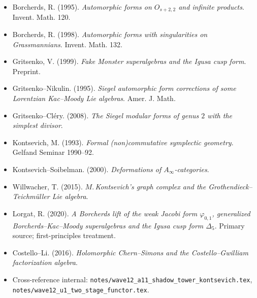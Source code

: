 \documentclass[11pt]{article}
\newcommand{\phii}{\varphi_{0,1}}
\newcommand{\Dlt}{\Delta_5}
\begin{document}
\begin{itemize}
\item Borcherds, R. (1995). \emph{Automorphic forms on $O_{s+2,2}$
and infinite products}. Invent. Math. 120.
\item Borcherds, R. (1998). \emph{Automorphic forms with
singularities on Grassmannians}. Invent. Math. 132.
\item Gritsenko, V. (1999). \emph{Fake Monster
superalgebras and the Igusa cusp form}. Preprint.
\item Gritsenko--Nikulin. (1995). \emph{Siegel automorphic form
corrections of some Lorentzian Kac--Moody Lie algebras}. Amer. J. Math.
\item Gritsenko--Cl{\'e}ry. (2008). \emph{The Siegel modular
forms of genus $2$ with the simplest divisor}.
\item Kontsevich, M. (1993). \emph{Formal (non)commutative
symplectic geometry}. Gelfand Seminar 1990--92.
\item Kontsevich--Soibelman. (2000). \emph{Deformations of
$A_\infty$-categories}.
\item Willwacher, T. (2015). \emph{$M.\,$Kontsevich's graph
complex and the Grothendieck--Teichm{\"u}ller Lie algebra}.
\item Lorgat, R. (2020). \emph{A Borcherds lift of the weak
Jacobi form $\phii$, generalized Borcherds--Kac--Moody
superalgebras and the Igusa cusp form $\Dlt$}. Primary
source; first-principles treatment.
\item Costello--Li. (2016). \emph{Holomorphic Chern--Simons
and the Costello--Gwilliam factorization algebra}.
\item Cross-reference internal:
\texttt{notes/wave12\_a11\_shadow\_tower\_kontsevich.tex},
\texttt{notes/wave12\_u1\_two\_stage\_functor.tex}.
\end{itemize}
\end{document}

